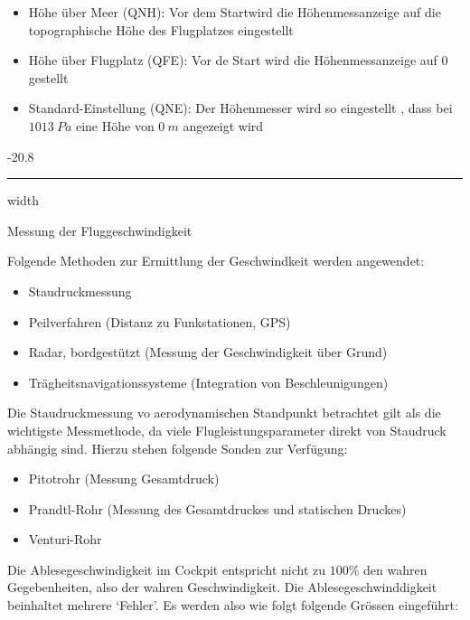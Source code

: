 \documentclass[8pt, landscape, fleqn]{scrartcl}
\makeatletter
\renewcommand{\subsubsection}{\@startsection{subsubsection}{1}{0mm}%
{-2\baselineskip}{0.8\baselineskip}%
{\hrule depth 0.2pt width\columnwidth\vspace*{1.2em}\normalsize\bfseries\rmfamily}}
\makeatother
\begin{document}
\begin{multicols*}{3}
\begin{itemize}
    \item Höhe über Meer (QNH): Vor dem Startwird die Höhenmessanzeige auf die topographische Höhe des Flugplatzes eingestellt
    \item Höhe über Flugplatz (QFE): Vor de Start wird die Höhenmessanzeige auf $0$ gestellt
    \item Standard-Einstellung (QNE): Der Höhenmesser wird so eingestellt , dass bei $1013~Pa$ eine Höhe von $0~m$ angezeigt wird
\end{itemize}

\subsubsection{Messung der Fluggeschwindigkeit}

Folgende Methoden zur Ermittlung der Geschwindkeit werden angewendet:

\begin{itemize}
    \item Staudruckmessung
    \item Peilverfahren (Distanz zu Funkstationen, GPS)
    \item Radar, bordgestützt (Messung der Geschwindigkeit über Grund)
    \item Trägheitsnavigationssysteme (Integration von Beschleunigungen)
\end{itemize}

Die Staudruckmessung vo aerodynamischen Standpunkt betrachtet gilt als die wichtigste Messmethode, da viele Flugleistungsparameter direkt von Staudruck abhängig sind. Hierzu stehen folgende Sonden zur Verfügung:

\begin{itemize}
    \item Pitotrohr (Messung Gesamtdruck)
    \item Prandtl-Rohr (Messung des Gesamtdruckes und statischen Druckes)
    \item Venturi-Rohr
\end{itemize}

Die Ablesegeschwindigkeit im Cockpit entspricht nicht zu $100\%$ den wahren Gegebenheiten, also der wahren Geschwindigkeit. Die Ablesegeschwinddigkeit beinhaltet mehrere `Fehler'. Es werden also wie folgt folgende Grössen eingeführt:


\end{multicols*}
\end{document}
